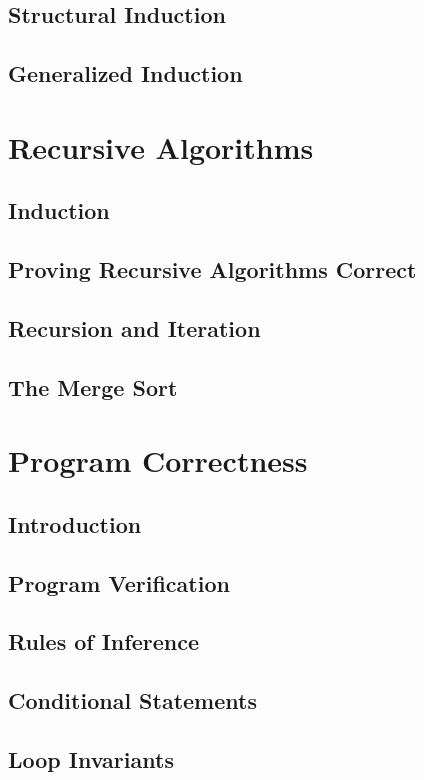 \documentclass[11pt]{book}
\begin{document}
  \subsection{Structural Induction}
  \subsection{Generalized Induction}
  
 \section{Recursive Algorithms}
  \subsection{Induction}
  \subsection{Proving Recursive Algorithms Correct}
  \subsection{Recursion and Iteration}
  \subsection{The Merge Sort}
  
 \section{Program Correctness}
  \subsection{Introduction}
  \subsection{Program Verification}
  \subsection{Rules of Inference}
  \subsection{Conditional Statements}
  \subsection{Loop Invariants}
 
\end{document}
